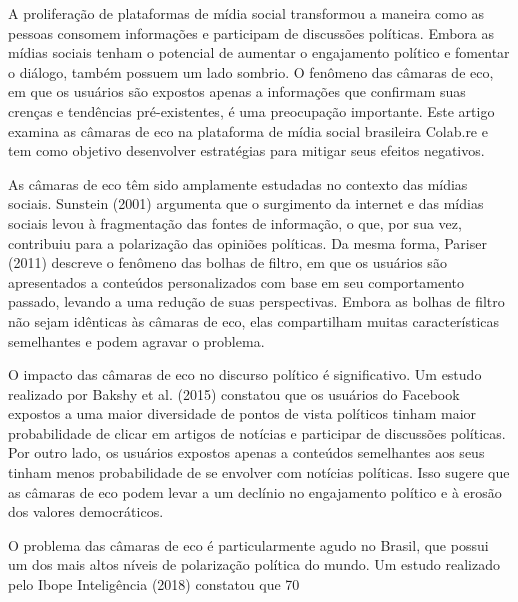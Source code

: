 \newcommand{\comando}[1]{\textbf{$\backslash$#1}}

A proliferação de plataformas de mídia social transformou a maneira como as pessoas consomem informações e participam de discussões políticas. Embora as mídias sociais tenham o potencial de aumentar o engajamento político e fomentar o diálogo, também possuem um lado sombrio. O fenômeno das câmaras de eco, em que os usuários são expostos apenas a informações que confirmam suas crenças e tendências pré-existentes, é uma preocupação importante. Este artigo examina as câmaras de eco na plataforma de mídia social brasileira Colab.re e tem como objetivo desenvolver estratégias para mitigar seus efeitos negativos.

As câmaras de eco têm sido amplamente estudadas no contexto das mídias sociais. Sunstein (2001) argumenta que o surgimento da internet e das mídias sociais levou à fragmentação das fontes de informação, o que, por sua vez, contribuiu para a polarização das opiniões políticas. Da mesma forma, Pariser (2011) descreve o fenômeno das bolhas de filtro, em que os usuários são apresentados a conteúdos personalizados com base em seu comportamento passado, levando a uma redução de suas perspectivas. Embora as bolhas de filtro não sejam idênticas às câmaras de eco, elas compartilham muitas características semelhantes e podem agravar o problema.

O impacto das câmaras de eco no discurso político é significativo. Um estudo realizado por Bakshy et al. (2015) constatou que os usuários do Facebook expostos a uma maior diversidade de pontos de vista políticos tinham maior probabilidade de clicar em artigos de notícias e participar de discussões políticas. Por outro lado, os usuários expostos apenas a conteúdos semelhantes aos seus tinham menos probabilidade de se envolver com notícias políticas. Isso sugere que as câmaras de eco podem levar a um declínio no engajamento político e à erosão dos valores democráticos.

O problema das câmaras de eco é particularmente agudo no Brasil, que possui um dos mais altos níveis de polarização política do mundo. Um estudo realizado pelo Ibope Inteligência (2018) constatou que 70%

